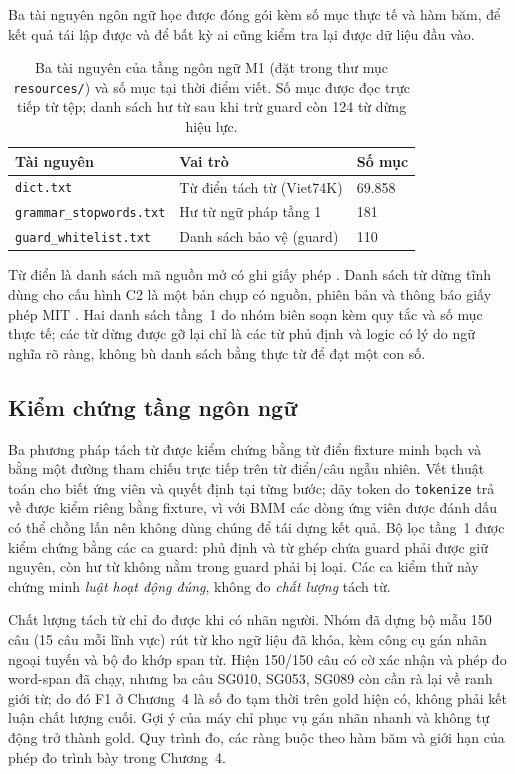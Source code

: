 Ba tài nguyên ngôn ngữ học được đóng gói kèm số mục thực tế và hàm băm, để kết quả
tái lập được và để bất kỳ ai cũng kiểm tra lại được dữ liệu đầu vào.

\begin{table}[ht]
\centering
\begin{tabular}{|p{}|p{}|p{}|}
\hline
Tài nguyên & Vai trò & Số mục \\
\hline
\texttt{dict.txt} & Từ điển tách từ (Viet74K) & 69.858 \\
\texttt{grammar\_\allowbreak stopwords.txt} & Hư từ ngữ pháp tầng 1 & 181 \\
\texttt{guard\_\allowbreak whitelist.txt} & Danh sách bảo vệ (guard) & 110 \\
\hline
\end{tabular}
\caption{Ba tài nguyên của tầng ngôn ngữ M1 (đặt trong thư mục \texttt{resources/})
và số mục tại thời điểm viết. Số mục được đọc trực tiếp từ tệp; danh sách hư từ sau
khi trừ guard còn 124 từ dừng hiệu lực.}
\label{tab:m1-tai-nguyen}
\end{table}

Từ điển là danh sách mã nguồn mở có ghi giấy phép \cite{viet74k}. Danh sách từ
dừng tĩnh dùng cho cấu hình C2 là một bản chụp có nguồn, phiên bản và thông báo
giấy phép MIT \cite{static_stopwords}. Hai danh sách tầng~1 do nhóm biên soạn kèm
quy tắc và số mục thực tế; các từ dừng được gỡ lại chỉ là các từ phủ định và logic
có lý do ngữ nghĩa rõ ràng, không bù danh sách bằng thực từ để đạt một con số.

\subsection{Kiểm chứng tầng ngôn ngữ}

Ba phương pháp tách từ được kiểm chứng bằng từ điển fixture minh bạch và bằng một
đường tham chiếu trực tiếp trên từ điển/câu ngẫu nhiên. Vết thuật toán cho biết ứng
viên và quyết định tại từng bước; dãy token do \texttt{tokenize} trả về được kiểm
riêng bằng fixture, vì với BMM các dòng ứng viên được đánh dấu có thể chồng lấn nên
không dùng chúng để tái dựng kết quả. Bộ lọc tầng~1 được kiểm chứng
bằng các ca guard: phủ định và từ ghép chứa guard phải được giữ nguyên, còn hư từ
không nằm trong guard phải bị loại. Các ca kiểm thử này chứng minh \emph{luật hoạt
động đúng}, không đo \emph{chất lượng} tách từ.

Chất lượng tách từ chỉ đo được khi có nhãn người. Nhóm đã dựng bộ mẫu 150 câu
(15 câu mỗi lĩnh vực) rút từ kho ngữ liệu đã khóa, kèm công cụ gán nhãn ngoại
tuyến và bộ đo khớp span từ. Hiện 150/150 câu có cờ xác nhận và phép đo word-span
đã chạy, nhưng ba câu SG010, SG053, SG089 còn cần rà lại về ranh giới từ; do đó
F1 ở Chương~4 là số đo tạm thời trên gold hiện có, không phải kết luận chất lượng
cuối. Gợi ý của máy chỉ phục vụ gán nhãn nhanh và không tự động trở thành gold.
Quy trình đo, các ràng buộc theo hàm băm và giới hạn của phép đo trình bày trong
Chương~4.
